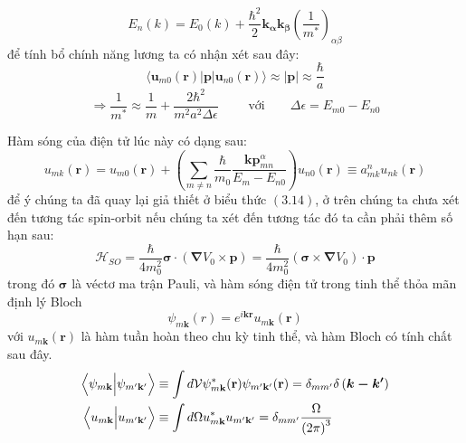 \begin{equation}
E_n\left(k\right) =E_0\left(k\right)+ \frac{\hbar^2}{2}\mathbf{k_\alpha}\mathbf{k_\beta}\left(\frac{1}{m^*}\right)_{\alpha\beta}
\end{equation} 
để tính bổ chính năng lương ta có nhận xét sau đây:
\begin{equation}
\langle \mathbf{u}_{m0}\left(\mathbf{r}\right)|\mathbf{p}|\mathbf{u}_{n0}\left(\mathbf{r}\right)\rangle \approx |\mathbf{p}| \approx \frac{\hbar}{a}
\end{equation}
\begin{equation}
\Longrightarrow \frac{1}{m^*} \approx \frac{1}{m}+\frac{2\hbar^2}{m^2a^2\Delta\epsilon}  \qquad \text{ với}\qquad \Delta\epsilon = E_{m0}-E_{n0}
\end{equation}

Hàm sóng của điện tử lúc này có dạng sau:
\begin{equation}
u_{mk}\left(\mathbf{r}\right) = u_{m0}\left(\mathbf{r}\right) + \left(\sum_{m\neq n}\frac{\hbar}{m_0}\frac{\mathbf{k}\mathbf{p}_{mn}^\alpha}{E_{m}-E_{n0}}\right)u_{n0}\left(\mathbf{r}\right) \equiv a_{mk}^nu_{nk}\left(\mathbf{r}\right)
\end{equation}
để ý chúng ta đã quay lại giả thiết ở biểu thức $(3.14)$, ở trên chúng ta chưa xét đến tương tác spin-orbit nếu chúng ta xét đến tương tác đó ta cần phải thêm số hạn sau:
\begin{equation}
\mathcal{H}_{SO} = \frac{\hbar}{4m^2_0}\boldsymbol{\sigma} \cdot \left(\boldsymbol{\nabla} V_0\times \boldsymbol{p} \right) =  \frac{\hbar}{4m^2_0}\left(\boldsymbol{\sigma}\times \boldsymbol{\nabla}V_0\right)\cdot\boldsymbol{p}
\end{equation}
trong đó $\boldsymbol{\sigma}$ là véctơ ma trận Pauli, và hàm sóng điện tử trong tinh thể thỏa mãn định lý Bloch
\begin{equation}
\psi_{m\mathbf{k}}(r) = e^{i\mathbf{kr}}u_{m\mathbf{k}}(\mathbf{r})
\end{equation}
với $u_{m\mathbf{k}}(\mathbf{r})$ là hàm tuần hoàn theo chu kỳ tinh thể, và hàm Bloch có tính chất sau đây.
\begin{align}
\left \langle\psi_{m\mathbf{k}}\Bigl\vert\psi_{m'\mathbf{k}'}\right \rangle &\equiv \int d\mathcal{V}\psi_{m\mathbf{k}}^*(\mathbf{r})\psi_{m'\mathbf{k}'}(\mathbf{r}) = \delta_{mm'}\delta\left(\boldsymbol{k-k'}\right) \\
\left \langle u_{m\mathbf{k}}\Bigl\vert u_{m'\mathbf{k}'}\right \rangle &\equiv \int d\Omega u_{m\mathbf{k}}^* u_{m'\mathbf{k}'} = \delta_{mm'}\frac{\Omega}{\left(2\pi \right)^3}
\end{align}
